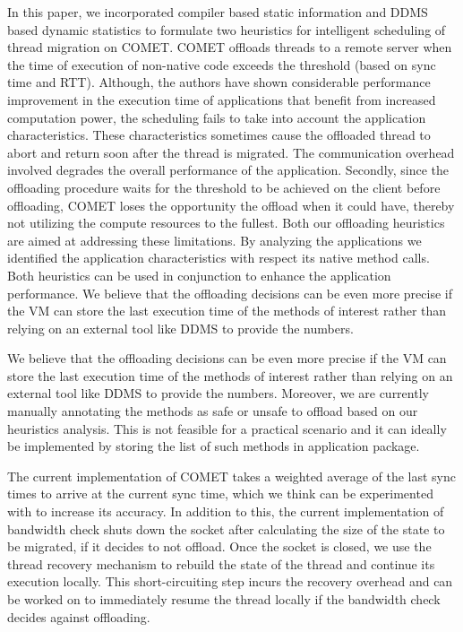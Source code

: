 In this paper, we incorporated compiler based static information and DDMS based dynamic statistics to formulate two heuristics for intelligent scheduling of thread migration on COMET. COMET offloads threads to a remote server when the time of execution of non-native code exceeds the threshold (based on sync time and RTT). Although, the authors have shown considerable performance improvement in the execution time of applications that benefit from increased computation power, the scheduling fails to take into account the application characteristics. These characteristics sometimes cause the offloaded thread to abort and return soon after the thread is migrated. The communication overhead involved degrades the overall performance of the application. Secondly, since the offloading procedure waits for the threshold to be achieved on the client before offloading, COMET loses the opportunity the offload when it could have, thereby not utilizing the compute resources to the fullest.
Both our offloading heuristics are aimed at addressing these limitations. By analyzing the applications we identified the application characteristics with respect its native method calls. Both heuristics can be used in conjunction to enhance the application performance.
We believe that the offloading decisions can be even more precise if the VM can store the last execution time of the methods of interest rather than relying on an external tool like DDMS to provide the numbers.

We believe that the offloading decisions can be even more precise if the VM can store the last execution time of the methods of interest rather than relying on an external tool like DDMS to provide the numbers. Moreover, we are currently manually annotating the methods as safe or unsafe to offload based on our
heuristics analysis. This is not feasible for a practical scenario and it can ideally be implemented by storing the list of such methods in application package.

The current implementation of COMET takes a weighted average of the last sync times to arrive at the current sync time, which we think can be experimented with to increase its accuracy. In addition to this, the current implementation of bandwidth check shuts down the socket after calculating the size of the state to be migrated, if it decides to not offload. Once the socket is closed, we use the thread recovery mechanism to rebuild the state of the thread and continue its execution locally. This short-circuiting step incurs the recovery overhead and can be worked on to immediately resume the thread locally if the bandwidth check decides against offloading.

